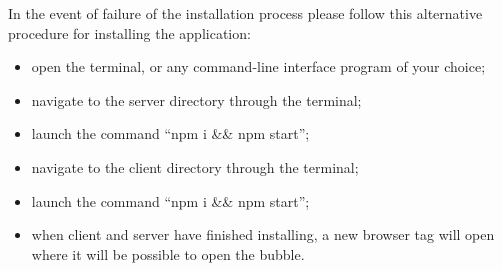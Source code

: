 In the event of failure of the installation process please follow this alternative procedure for installing the application:
\begin{itemize}
	\item open the terminal, or any command-line interface program of your choice;
	\item navigate to the server directory through the terminal;
	\item launch the command ``npm i \&\& npm start'';
	\item navigate to the client directory through the terminal;
	\item launch the command ``npm i \&\& npm start'';
	\item when client and server have finished installing, a new browser tag will open where it will be possible to open the bubble.
\end{itemize}
